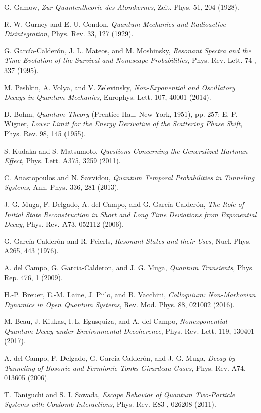 \documentclass[12pt]{article}
\numberwithin{equation}{section}
\begin{document}
\begin{thebibliography}{}
  G. Gamow, {\em Zur Quantentheorie des Atomkernes},  Zeit.  Phys.  51, 204 (1928).

 R. W. Gurney and E. U. Condon, {\em Quantum Mechanics and Radioactive Disintegration}, Phys. Rev. 33,  127 (1929).

 G. Garc\'ia-Calder\'on, J. L. Mateos, and M. Moshinsky, {\em Resonant Spectra and the Time Evolution of the Survival and Nonescape Probabilities},
Phys. Rev. Lett. 74 , 337 (1995).

  M. Peshkin, A. Volya, and V. Zelevinsky, {\em Non-Exponential and Oscillatory Decays in Quantum Mechanics}, Europhys. Lett. 107, 40001 (2014).

 D. Bohm,
{\em Quantum Theory}
(Prentice Hall, New York, 1951), pp. 257; E. P. Wigner, {\em Lower Limit for the Energy Derivative of the Scattering Phase Shift}, Phys.
Rev. 98, 145 (1955).

 S. Kudaka and S. Matsumoto, {\em  Questions Concerning the Generalized Hartman Eﬀect}, Phys. Lett. A375, 3259 (2011).

    C. Anastopoulos and N. Savvidou, {\em Quantum Temporal Probabilities in Tunneling Systems}, Ann. Phys. 336, 281 (2013).

 J. G. Muga, F. Delgado, A. del Campo, and  G. Garc\'ia-Calder\'on, {\em The Role of Initial State Reconstruction in Short and Long Time Deviations from Exponential Decay}, Phys. Rev. A73, 052112 (2006).


 G. Garc\'ia-Calder\'on and R. Peierls, {\em Resonant States and their Uses}, Nucl. Phys. A265, 443 (1976).

 A. del Campo, G. Garcia-Calderon, and J. G. Muga, {\em Quantum Transients}, Phys. Rep. 476, 1 (2009).


      H.-P. Breuer, E.-M. Laine, J. Piilo, and B. Vacchini, {\em Colloquium: Non-Markovian Dynamics in Open Quantum Systems}, Rev. Mod. Phys. 88, 021002 (2016).

 M. Beau, J. Kiukas, I. L. Egusquiza, and A. del Campo, {\em Nonexponential Quantum Decay under Environmental Decoherence}, Phys. Rev. Lett. 119, 130401 (2017).


 A. del Campo, F. Delgado, G. García-Calderón, and J. G. Muga, {\em Decay by Tunneling of Bosonic and Fermionic Tonks-Girardeau Gases}, Phys. Rev. A74, 013605 (2006).

 T. Taniguchi and S. I. Sawada, {\em Escape Behavior of Quantum Two-Particle Systems with Coulomb Interactions}, Phys. Rev. E83 , 026208 (2011).


\end{thebibliography}
\end{document}
